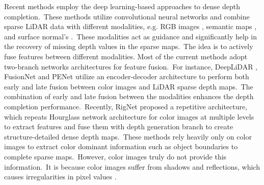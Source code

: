 \documentclass{ieeeaccess}
\begin{document}
Recent methods \cite{Qiu_2019_CVPR,hu2020PENet,yan2021rignet,lee2021depth,Multi-TaskGan,zhao2021adaptive,liu2021fcfr,cheng2020cspn++,chen2019learning}  employ the deep learning-based approaches to dense depth completion.~These methods utilize convolutional neural networks and combine sparse LiDAR data with different modalities, e.g. RGB images \cite{hu2020PENet, yan2021rignet}, semantic maps \cite{Multi-TaskGan,schneider2016semantically,chen2019towards}, and surface normal's \cite{Qiu_2019_CVPR}.~These modalities act as guidance and significantly help in the recovery of missing depth values in the sparse maps.~The idea is to actively fuse features between different modalities. Most of the current methods adopt two-branch networks architectures for feature fusion.~For instance, DeepLiDAR \cite{Qiu_2019_CVPR}, FusionNet \cite{vangansbeke2019sparse} and PENet \cite{hu2020PENet} utilize an encoder-decoder architecture to perform both early and late fusion between color images and LiDAR sparse depth maps.~The combination of early and late fusion between the modalities enhances the depth completion performance.~Recently, RigNet \cite{yan2021rignet} proposed a repetitive architecture, which repeats Hourglass network architecture for color images at multiple levels to extract features and fuse them with depth generation branch to create structure-detailed dense depth maps.~These methods rely heavily only on color images to extract color dominant information such as object boundaries to complete sparse maps.~However, color images truly do not provide this information.~It is because color images suffer from shadows and reflections, which causes irregularities in pixel values \cite{chen2019towards}.
\end{document}
